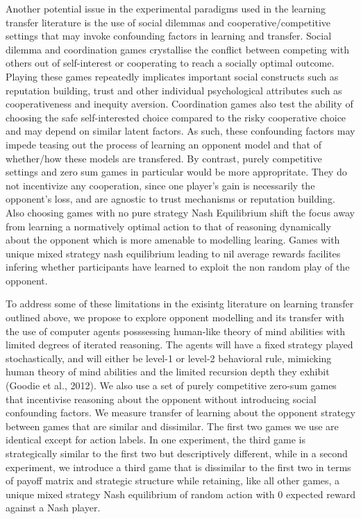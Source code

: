 \documentclass[12pt]{article}         %
\begin{document}
Another potential issue in the experimental paradigms used in the learning transfer literature is the use of social dilemmas and cooperative/competitive settings that may invoke confounding factors in learning and transfer. Social dilemma and coordination games crystallise the conflict between competing with others out of self-interest or cooperating to reach a socially optimal outcome. Playing these games repeatedly implicates important social constructs such as reputation building, trust and other individual psychological attributes such as cooperativeness and inequity aversion. Coordination games also test the ability of choosing the safe self-interested choice compared to the risky cooperative choice and may depend on similar latent factors. As such, these confounding factors may impede teasing out the process of learning an opponent model and that of whether/how these models are transfered. By contrast, purely competitive settings and zero sum games in particular would be more appropritate. They do not incentivize any cooperation, since one player's gain is necessarily the opponent's loss, and are agnostic to trust mechanisms or reputation building. Also choosing games with no pure strategy Nash Equilibrium shift the focus away from learning a normatively optimal action to that of reasoning dynamically about the opponent which is more amenable to modelling learing. Games with unique mixed strategy nash equilibrium leading to nil average rewards facilites infering whether participants have learned to exploit the non random play of the opponent.
  

To address some of these limitations in the exisintg literature on learning transfer outlined above, we propose to explore opponent modelling and its transfer with the use of computer agents posssessing human-like theory of mind abilities with limited degrees of iterated reasoning. The agents will have a fixed strategy played stochastically, and will either be level-1 or level-2 behavioral rule, mimicking human theory of mind abilities and the limited recursion depth they exhibit (Goodie et al., 2012). We also use a set of purely competitive zero-sum games that incentivise reasoning about the opponent without introducing social confounding factors. We measure transfer of learning about the opponent strategy between games that are similar and dissimilar. The first two games we use are identical except for action labels. In one experiment, the third game is strategically similar to the first two but descriptively different, while in a second experiment, we introduce a third game that is dissimilar to the first two in terms of payoff matrix and strategic structure while retaining, like all other games, a unique mixed strategy Nash equilibrium of random action with 0 expected reward against a Nash player. 
\end{document}
